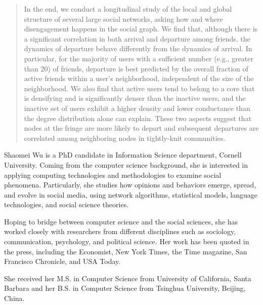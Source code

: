 \documentclass[phd,tocprelim]{cornell}
\begin{document}
\begin{abstract}
In the end, we conduct a longitudinal study of the local and global structure of several large social networks, asking how and where disengagement happens in the social graph. We find that, although there is a significant correlation in both arrival and departure among friends, the dynamics of departure behave differently from the dynamics of arrival. 
In particular, for the majority of users with a sufficient number (e.g., greater than 20) of friends, departure is best predicted by the overall fraction of active friends within a user's neighborhood, independent of the size of the  neighborhood. We also find that active users tend to belong to a core that is densifying and is significantly denser than the inactive users, and the inactive set of users exhibit a higher density and lower conductance than the degree distribution alone can explain. These two aspects suggest that nodes at the fringe are more likely to depart and subsequent departures are correlated among neighboring nodes in tightly-knit communities. 


\end{abstract}

\begin{biosketch}
Shaomei Wu is a PhD candidate in Information Science department, Cornell University. Coming from the computer science background, she is interested in applying computing technologies and methodologies to examine social phenomena. Particularly, she studies how opinions and behaviors emerge, spread, and evolve in social media, using network algorithms, statistical models, language technologies, and social science theories.

Hoping to bridge between computer science and the social sciences, she has worked closely with researchers from different disciplines such as sociology, communication, psychology, and political science. Her work has been quoted in the press, including the Economist, New York Times, the Time magazine, San Francisco Chronicle, and USA Today.


She received her M.S. in Computer Science from University of California, Santa Barbara and her B.S. in Computer Science from Tsinghua University, Beijing, China.

\end{biosketch}
\end{document}

